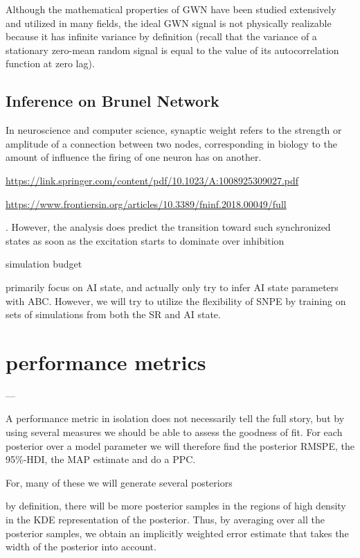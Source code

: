 Although the mathematical properties of GWN have been studied extensively and utilized in many fields, the ideal GWN signal is not physically realizable because it has infinite variance by definition (recall that the variance of a stationary zero-mean random signal is equal to the value of its autocorrelation function at zero lag).




\subsection{Inference on Brunel Network}

In neuroscience and computer science, synaptic weight refers to the strength or amplitude of a connection between two nodes, corresponding in biology to the amount of influence the firing of one neuron has on another.

\url{https://link.springer.com/content/pdf/10.1023/A:1008925309027.pdf}

\url{https://www.frontiersin.org/articles/10.3389/fninf.2018.00049/full}

. However, the analysis does predict the transition
toward such synchronized states as soon as the excitation starts to dominate over inhibition

simulation budget

primarily focus on AI state, and actually only try to infer AI state parameters with ABC. However, we will try to utilize the flexibility of SNPE by training on sets of simulations from both the SR and AI state.

\section{performance metrics}


---

A performance metric in isolation does not necessarily tell the full story, but by using several measures we should be able to assess the goodness of fit. For each posterior over a model parameter we will therefore find the posterior RMSPE, the 95\%-HDI, the MAP estimate and do a PPC.

For, many of these we will generate several posteriors 



by definition, there will be more posterior samples in the regions of high density in the KDE representation of the posterior. Thus, by averaging over all the posterior samples, we obtain an implicitly weighted error estimate that takes the width of the posterior into account. 

